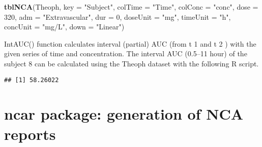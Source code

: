 \documentclass[12pt,]{krantz}
\newenvironment{Shaded}{\begin{snugshade}}{\end{snugshade}}
\newcommand{\KeywordTok}[1]{\textcolor[rgb]{0.13,0.29,0.53}{\textbf{#1}}}
\newcommand{\DataTypeTok}[1]{\textcolor[rgb]{0.13,0.29,0.53}{#1}}
\newcommand{\DecValTok}[1]{\textcolor[rgb]{0.00,0.00,0.81}{#1}}
\newcommand{\FloatTok}[1]{\textcolor[rgb]{0.00,0.00,0.81}{#1}}
\newcommand{\StringTok}[1]{\textcolor[rgb]{0.31,0.60,0.02}{#1}}
\newcommand{\OperatorTok}[1]{\textcolor[rgb]{0.81,0.36,0.00}{\textbf{#1}}}
\newcommand{\NormalTok}[1]{#1}
\theoremstyle{definition}
\theoremstyle{definition}
\theoremstyle{definition}
\theoremstyle{remark}
\begin{document}
\begin{Shaded}
\begin{Highlighting}[]
\KeywordTok{tblNCA}\NormalTok{(Theoph, }\DataTypeTok{key =} \StringTok{"Subject"}\NormalTok{, }\DataTypeTok{colTime =} \StringTok{"Time"}\NormalTok{, }\DataTypeTok{colConc =} \StringTok{"conc"}\NormalTok{, }\DataTypeTok{dose =} \DecValTok{320}\NormalTok{, }
       \DataTypeTok{adm =} \StringTok{"Extravascular"}\NormalTok{, }\DataTypeTok{dur =} \DecValTok{0}\NormalTok{, }\DataTypeTok{doseUnit =} \StringTok{"mg"}\NormalTok{, }\DataTypeTok{timeUnit =} \StringTok{"h"}\NormalTok{, }\DataTypeTok{concUnit =} \StringTok{"mg/L"}\NormalTok{, }
       \DataTypeTok{down =} \StringTok{"Linear"}\NormalTok{)}
\end{Highlighting}
\end{Shaded}

IntAUC() function calculates interval (partial) AUC (from t 1 and t 2 )
with the given series of time and concentration. The interval AUC
(0.5--11 hour) of the subject 8 can be calculated using the Theoph
dataset with the following R script.

\begin{Shaded}
\end{Shaded}

\begin{verbatim}
## [1] 58.26022
\end{verbatim}

\section{ncar package: generation of NCA
reports}\label{ncar-package-generation-of-nca-reports}
\end{document}
